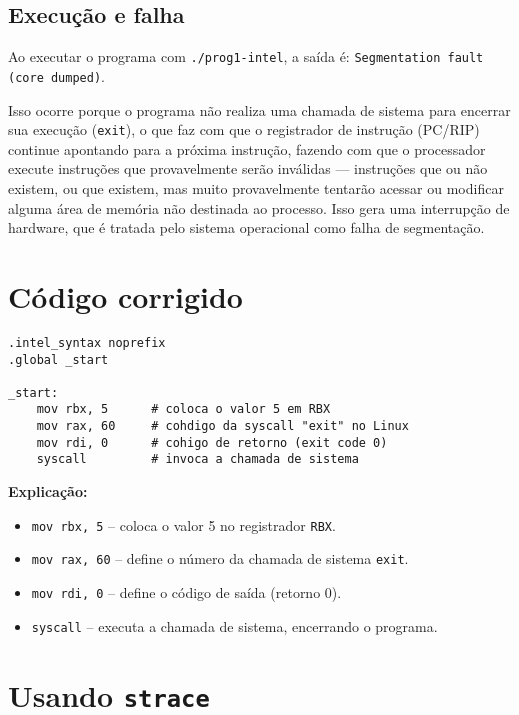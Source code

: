 \documentclass[12pt]{article}
\begin{document}
\subsection*{Execução e falha}

Ao executar o programa com \texttt{./prog1-intel}, a saída é:  
\texttt{Segmentation fault (core dumped)}.  

Isso ocorre porque o programa não realiza uma chamada de sistema para encerrar sua execução
(\texttt{exit}), o que faz com que o registrador de instrução (PC/RIP) continue apontando para a próxima instrução,  
fazendo com que o processador execute instruções que provavelmente serão inválidas —  
instruções que ou não existem, ou que existem, mas muito provavelmente tentarão acessar ou modificar alguma área de memória não destinada ao processo.  
Isso gera uma interrupção de hardware, que é tratada pelo sistema operacional como falha de segmentação.





\section*{Código corrigido}

\begin{lstlisting}[style=modern, language={[x86masm]Assembler}]
.intel_syntax noprefix
.global _start

_start:
    mov rbx, 5      # coloca o valor 5 em RBX
    mov rax, 60     # cohdigo da syscall "exit" no Linux
    mov rdi, 0      # cohigo de retorno (exit code 0)
    syscall         # invoca a chamada de sistema
\end{lstlisting}

\textbf{Explicação:}

\begin{itemize}
  \item \texttt{mov rbx, 5} – coloca o valor 5 no registrador \texttt{RBX}.
  \item \texttt{mov rax, 60} – define o número da chamada de sistema \texttt{exit}.
  \item \texttt{mov rdi, 0} – define o código de saída (retorno 0).
  \item \texttt{syscall} – executa a chamada de sistema, encerrando o programa.
\end{itemize}

\newpage

\section*{Usando \texttt{strace}}
\end{document}
